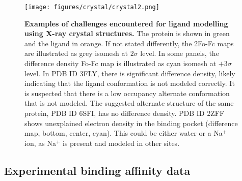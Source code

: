 \documentclass[9pt,bestpractices,pubversion]{livecoms}
\begin{document}
\begin{figure}
    \centering
    \texttt{[image: figures/crystal/crystal2.png]}
    {
        \label{fig:3fly}
        \label{fig:6sfi}
        \label{fig:2zff}
    }
    
    \caption{
    \textbf{Examples of challenges encountered for ligand modelling using X-ray crystal structures.}
    The protein is shown in green and the ligand in orange. If not stated differently, the 2Fo-Fc maps are illustrated as grey isomesh at $2\sigma$ level. In some panels, the difference density Fo-Fc map is illustrated as cyan isomesh at $+3\sigma$ level.
    \textbf{} In PDB ID 3FLY, there is significant difference density, likely indicating that the ligand conformation is not modeled correctly.  It is suspected that there is a low occupancy alternate conformation that is not modeled.
    \textbf{} The suggested alternate structure of the same protein, PDB ID 6SFI, has no difference density.
    \textbf{} PDB ID 2ZFF shows unexplained electron density in the binding pocket (difference map, bottom, center, cyan). This could
    be either water or a Na$^+$ ion, as Na$^+$ is present and modeled in other sites. 
    }
    \label{fig:crystal2}
\end{figure}
\subsection{Experimental binding affinity data}
\label{sec:affinities}
\end{document}

